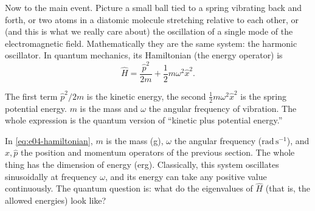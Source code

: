 Now to the main event. Picture a small ball tied to a spring vibrating back and forth, or two atoms in a diatomic molecule stretching relative to each other, or (and this is what we really care about) the oscillation of a single mode of the electromagnetic field. Mathematically they are the same system: the harmonic oscillator. In quantum mechanics, its Hamiltonian (the energy operator) is
\begin{equation}
  \hat H=\frac{\hat p^2}{2m}+\frac{1}{2}m\omega^2\hat x^2 .
  \label{eq:e04-hamiltonian}
\end{equation}
\begin{formulaexplain}
The first term \(\hat p^2/2m\) is the kinetic energy, the second \(\tfrac12 m\omega^2\hat x^2\) is the spring potential energy. \(m\) is the mass and \(\omega\) the angular frequency of vibration. The whole expression is the quantum version of ``kinetic plus potential energy.''
\end{formulaexplain}
In \eqref{eq:e04-hamiltonian}, \(m\) is the mass (g), \(\omega\) the angular frequency (\(\mathrm{rad\,s^{-1}}\)), and \(\hat x,\hat p\) the position and momentum operators of the previous section. The whole thing has the dimension of energy (erg). Classically, this system oscillates sinusoidally at frequency \(\omega\), and its energy can take any positive value continuously. The quantum question is: what do the eigenvalues of \(\hat H\) (that is, the allowed energies) look like?

